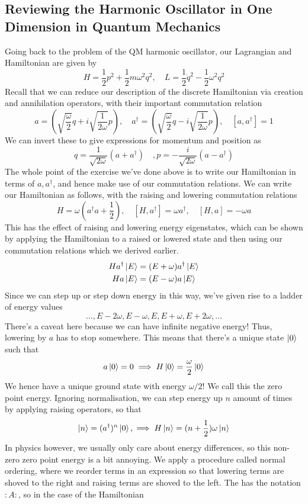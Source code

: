 \subsection{Reviewing the Harmonic Oscillator in One Dimension in Quantum Mechanics} 
Going back to the problem of the QM harmonic oscillator, our Lagrangian and Hamiltonian are given by 
\[ 
H  = \frac{1}{2}  p^2 + \frac{1}{2} m \omega^2 q^2, \quad L = \frac{1}{ 2} \dot{ q} ^2  - \frac{1}{ 2} \omega^2 q^2 
\]
Recall that we can reduce our description of the discrete Hamiltonian via creation and annihilation operators, with their important commutation relation 
\[ 
a = \left( \sqrt{\frac{\omega}{2}}  q + i \sqrt{\frac{1}{2 \omega}} p \right), \quad a^{\dagger} = \left( \sqrt{\frac{\omega}{2}}  q - i \sqrt{\frac{1}{2 \omega}} p \right), \quad [a, a^\dagger] = 1 
\] 
We can invert these to give expressions for momentum and position as 
\[ 
q = \frac{1}{ \sqrt{ 2 \omega} } ( a + a^\dagger) \quad, p =  - \frac{ i}{ \sqrt{ 2 \omega} } ( a - a^\dagger) 
\] 
The whole point of the exercise we've done above is to write our Hamiltonian in terms of $a, a^\dagger$, and hence make use of our commutation relations. We can write our Hamiltonian as follows, with the raising and lowering commutation relations
\[ 
H = \omega \left( a^\dagger a + \frac{1}{2} \right), \quad [ H, a^\dagger]  = \omega a^\dagger, \quad [ H, a ] = - \omega a  
\] 
This has the effect of raising and lowering energy eigenstates, which can be shown by applying the Hamiltonian to a raised or lowered state and then using our commutation relations which we derived earlier. 
\begin{align*} 
H a^\dagger\ket{ E} & = ( E+ \omega ) a^\dagger \ket{E} \\
H a \ket{ E}  & = ( E - \omega ) a \ket{E} 
\end{align*} 
Since we can step up or step down energy in this way, we've given rise to a ladder of energy values
\[ 
\dots, E - 2 \omega, E - \omega, E, E + \omega, E+ 2 \omega, \dots 
\] 
There's a caveat here because we can have infinite negative energy! Thus, lowering by $a$ has to stop somewhere. This means that there's a unique state  $\ket{0} $such that 
\[ 	
a \ket{0}  =0 \implies H \ket{ 0 }  = \frac{\omega}{ 2} \ket{ 0 } 
\] We hence have a unique ground state with energy $\omega / 2 $! We call this the zero point energy. Ignoring normalisation, we can step energy up $n$ amount of times by applying raising operators, so that 
\[ 	
\ket{n} = ( a^\dagger)^n \ket{ 0}, \implies H\ket{n}  = (n + \frac{ 1}{ 2})\omega\ket{n} 
\]
In physics however, we usually only care about energy differences, so this non-zero zero point energy is a bit annoying. We apply a procedure called normal ordering, where we reorder terms in an expression so that lowering terms are shoved to the right and raising terms are shoved to the left. The has the notation $: A:$, so in the case of the Hamiltonian 
